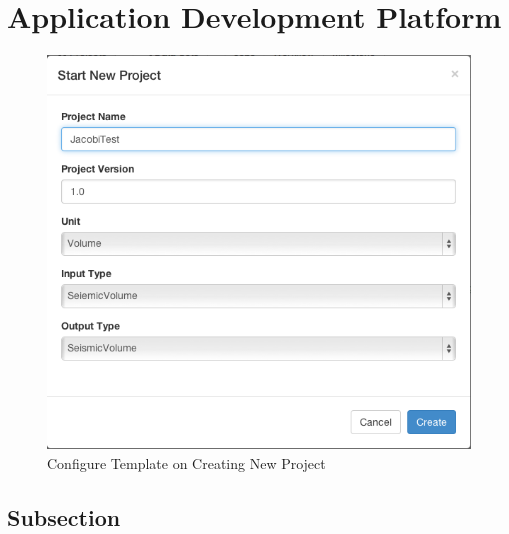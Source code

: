 \section{Application Development Platform}


\begin{figure}[H]
\centering
\includegraphics[scale=.50]{figures/NewProject.png}
\caption{Configure Template on Creating New Project}
\label{NewProject}
\end{figure}


\subsection{Subsection}

